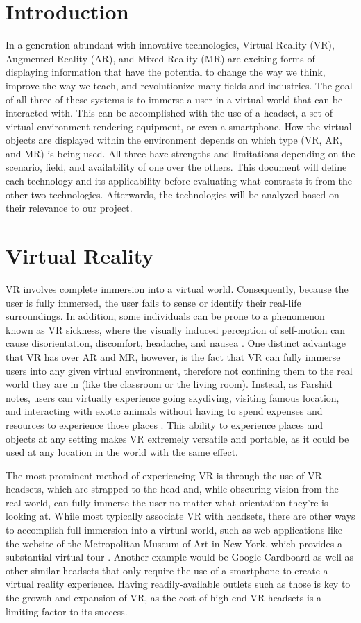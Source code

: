 \documentclass[onecolumn, draftclsnofoot,10pt, compsoc]{IEEEtran}
\begin{document}
\section{Introduction}
    In a generation abundant with innovative technologies, Virtual Reality (VR), Augmented Reality (AR), and Mixed Reality (MR) are exciting forms of displaying information that have the potential to change the way we think, improve the way we teach, and revolutionize many fields and industries. 
    The goal of all three of these systems is to immerse a user in a virtual world that can be interacted with. This can be accomplished with the use of a headset, a set of virtual environment rendering equipment, or even a smartphone. How the virtual objects are displayed within the environment depends on which type (VR, AR, and MR) is being used. All three have strengths and limitations depending on the scenario, field, and availability of one over the others. This document will define each technology and its applicability before evaluating what contrasts it from the other two technologies. Afterwards, the technologies will be analyzed based on their relevance to our project.
    
\section{Virtual Reality}
    VR involves complete immersion into a virtual world. Consequently, because the user is fully immersed, the user fails to sense or identify their real-life surroundings. In addition, some individuals can be prone to a phenomenon known as VR sickness, where the visually induced perception of self-motion can cause disorientation, discomfort, headache, and nausea \cite{2}. One distinct advantage that VR has over AR and MR, however, is the fact that VR can fully immerse users into any given virtual environment, therefore not confining them to the real world they are in (like the classroom or the living room). Instead, as Farshid notes, users can virtually experience going skydiving, visiting famous location, and interacting with exotic animals without having to spend expenses and resources to experience those places \cite{2}. This ability to experience places and objects at any setting makes VR extremely versatile and portable, as it could be used at any location in the world with the same effect.

    The most prominent method of experiencing VR is through the use of VR headsets, which are strapped to the head and, while obscuring vision from the real world, can fully immerse the user no matter what orientation they're is looking at. While most typically associate VR with headsets, there are other ways to accomplish full immersion into a virtual world, such as web applications like the website of the Metropolitan Museum of Art in New York, which provides a substantial virtual tour \cite{2}. Another example would be Google Cardboard as well as other similar headsets that only require the use of a smartphone to create a virtual reality experience. Having readily-available outlets such as those is key to the growth and expansion of VR, as the cost of high-end VR headsets is a limiting factor to its success. 
\end{document}
